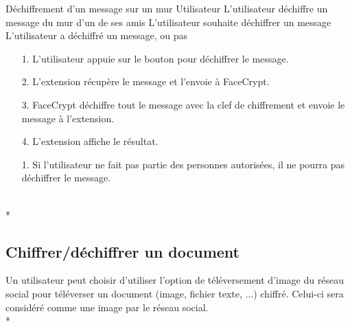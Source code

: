 \documentclass[a4paper,11pt,french]{article}
\begin{document}
\fiche
	{Déchiffrement d'un message sur un mur}
	{Utilisateur}
	{L'utilisateur déchiffre un message du mur d'un de ses amis}
	{}
	{L'utilisateur souhaite déchiffrer un message}
	{L'utilisateur a déchiffré un message, ou pas}
    {\begin{itemize}
        \item[]
        \item[1.] L'utilisateur appuie sur le bouton pour 
            déchiffrer le message.
    \end{itemize}
    }
	{\begin{itemize}
        \item[]
		\item[2.] L'extension récupère le message et l'envoie à 
            FaceCrypt.
        \item[3.] FaceCrypt déchiffre tout le message avec la clef
            de chiffrement et envoie le message à l'extension.
        \item[4.] L'extension affiche le résultat.
	\end{itemize}
	}
	{}
\flots
    {}
    {\begin{itemize}
    \item[]
    \item[1.] Si l'utilisateur ne fait pas partie des personnes
        autorisées, il ne pourra pas déchiffrer le message.
    \end{itemize}
    }
	{}    
\\*

\subsection{Chiffrer/déchiffrer un document}
Un utilisateur peut choisir d'utiliser l'option de téléversement
d'image du réseau social pour téléverser un document (image, 
fichier texte, ...) chiffré. Celui-ci sera considéré comme une image
par le réseau social.\\*
\end{document}
